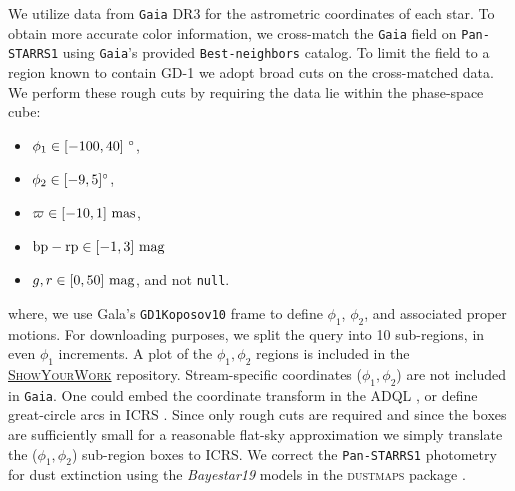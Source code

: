 \documentclass[twocolumn]{aastex631}
\newcommand{\package}[1]{\textsc{#1}}
\newcommand{\dataarchive}[1]{\texttt{#1}}
\newcommand{\Gaia}{\dataarchive{Gaia}}
\newcommand{\PanStarrs}{\dataarchive{Pan-STARRS1}}
\begin{document}
        We utilize data from \Gaia{} DR3 for the astrometric coordinates of
        each star. 
        To obtain more accurate color information, we cross-match the \Gaia{}
        field on \PanStarrs{} \citep{PanSTARRS1} using 
        \Gaia's provided \texttt{Best-neighbors} catalog.
        To limit the field to a region known to contain GD-1 we adopt broad cuts
        on the cross-matched data. We perform these rough cuts by requiring
        the data lie within the phase-space cube:
        \begin{itemize}
            \item $\phi_1 \in [-100, 40] \ \rm{\degree}$,
            \item $\phi_2 \in [-9, 5] \rm{\degree}$,
            \item $\varpi \in [-10, 1] \ \rm{mas}$,
            \item $\rm{bp-rp} \in [-1, 3] \ \rm{mag}$
            \item $g, r \in [0, 50] \ \rm{mag}$, and not \texttt{null}.
        \end{itemize}
        where, we use Gala's \citep{gala, galav1.3} \texttt{GD1Koposov10} frame
        \citep{Koposov+2010} to define $\phi_1$, $\phi_2$, and associated proper motions.
        For downloading purposes, we split the query into 10 sub-regions,
        in even $\phi_1$ increments. A plot of the $\phi_1, \phi_2$ regions is included
        in the \href{\GitHubURL{}}{\package{ShowYourWork}} repository.
        Stream-specific coordinates ($\phi_1, \phi_2$) are not included in \Gaia.
        One could embed the coordinate transform in the ADQL \citep{ADQL2.0},
        or define great-circle arcs in ICRS \citep{ICRS1997}. Since only rough
        cuts are required and since the boxes are sufficiently small for a reasonable flat-sky
        approximation  we simply translate the ($\phi_1, \phi_2$) sub-region boxes to ICRS.
        We correct the \PanStarrs{} photometry for dust extinction
        using the \textit{Bayestar19} \citep{Green+2019} models in the \package{dustmaps} package \citep{Green2018}.
\end{document}
